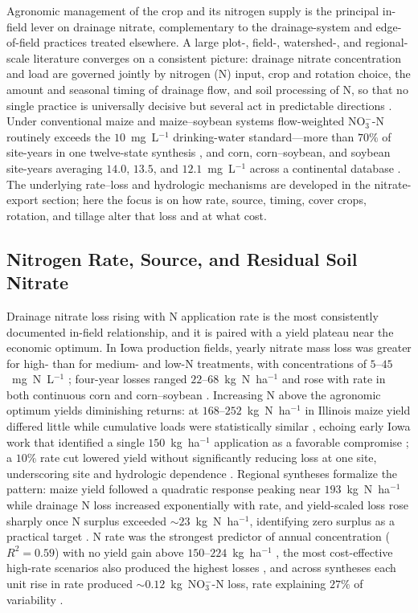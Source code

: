 Agronomic management of the crop and its nitrogen supply is the principal
in-field lever on drainage nitrate, complementary to the drainage-system and
edge-of-field practices treated elsewhere. A large plot-, field-,
watershed-, and regional-scale literature converges on a consistent picture:
drainage nitrate concentration and load are governed jointly by nitrogen (N)
input, crop and rotation choice, the amount and seasonal timing of drainage
flow, and soil processing of N, so that no single practice is universally
decisive but several act in predictable directions
\parencite{Dinnes2002}. Under conventional maize and maize--soybean systems
flow-weighted NO$_3^-$-N routinely exceeds the $10$~mg~L$^{-1}$
drinking-water standard---more than $70\%$ of site-years in one twelve-state
synthesis \parencite{Liu2021}, and corn, corn--soybean, and soybean
site-years averaging $14.0$, $13.5$, and $12.1$~mg~L$^{-1}$ across a
continental database \parencite{Hertzberger2019}. The underlying rate--loss
and hydrologic mechanisms are developed in the nitrate-export section; here
the focus is on how rate, source, timing, cover crops, rotation, and tillage
alter that loss and at what cost.

\subsection{Nitrogen Rate, Source, and Residual Soil Nitrate}

Drainage nitrate loss rising with N application rate is the most consistently
documented in-field relationship, and it is paired with a yield plateau near
the economic optimum. In Iowa production fields, yearly nitrate mass loss was
greater for high- than for medium- and low-N treatments, with concentrations
of $5$--$45$~mg~N~L$^{-1}$ \parencite{Jaynes2001}; four-year losses ranged
$22$--$68$~kg~N~ha$^{-1}$ and rose with rate in both continuous corn and
corn--soybean \parencite{Helmers2012b}. Increasing N above the agronomic
optimum yields diminishing returns: at $168$--$252$~kg~N~ha$^{-1}$ in
Illinois maize yield differed little while cumulative loads were
statistically similar \parencite{Li2023b}, echoing early Iowa work that
identified a single $150$~kg~ha$^{-1}$ application as a favorable compromise
\parencite{Azevedo1997}; a $10\%$ rate cut lowered yield without significantly
reducing loss at one site, underscoring site and hydrologic dependence
\parencite{Gentry2024}. Regional syntheses formalize the pattern: maize yield
followed a quadratic response peaking near $193$~kg~N~ha$^{-1}$ while drainage
N loss increased exponentially with rate, and yield-scaled loss rose sharply
once N surplus exceeded $\sim23$~kg~N~ha$^{-1}$, identifying zero surplus as a
practical target \parencite{Zhao2016}. N rate was the strongest predictor of
annual concentration ($R^2=0.59$) with no yield gain above
$150$--$224$~kg~ha$^{-1}$ \parencite{Hertzberger2019}, the most cost-effective
high-rate scenarios also produced the highest losses \parencite{Liu2021}, and
across syntheses each unit rise in rate produced $\sim0.12$~kg~NO$_3^-$-N
loss, rate explaining $27\%$ of variability
\parencite{Chatterjee2020b,Christianson2015b,Ritter2015}.

